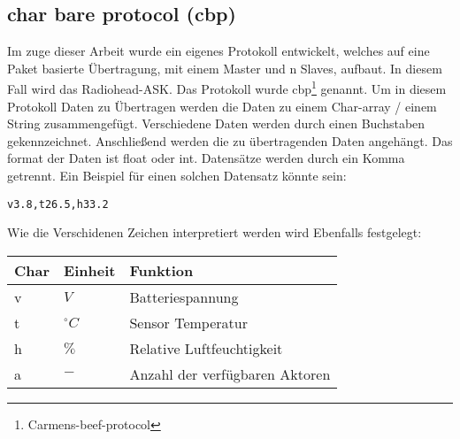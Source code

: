 \subsection{char bare protocol (cbp)}
Im zuge dieser Arbeit wurde ein eigenes Protokoll entwickelt, welches auf eine Paket basierte Übertragung, mit einem Master und n Slaves, aufbaut. In diesem Fall wird das Radiohead-ASK. Das Protokoll wurde cbp\footnote{Carmens-beef-protocol} genannt. Um in diesem Protokoll Daten zu Übertragen werden die Daten zu einem Char-array / einem String zusammengefügt. Verschiedene Daten werden durch einen Buchstaben gekennzeichnet. Anschließend werden die zu übertragenden Daten angehängt. Das format der Daten ist float oder int. Datensätze werden durch ein Komma getrennt. Ein Beispiel für einen solchen Datensatz könnte sein: \\
\begin{verbatim}
v3.8,t26.5,h33.2
\end{verbatim}
Wie die Verschidenen Zeichen interpretiert werden wird Ebenfalls festgelegt:\\
\begin{tabularx}{\textwidth}{|l|l|X|}
\hline
Char & Einheit & Funktion \\
\hline
v & $V$ & Batteriespannung\\
t & $^{\circ} C$ & Sensor Temperatur\\
h & $\%$ & Relative Luftfeuchtigkeit\\
a & $-$ & Anzahl der verfügbaren Aktoren\\
\hline
\end{tabularx}
